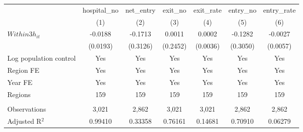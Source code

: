 \begingroup
\centering
\begin{tabular}{lcccccc}
   \toprule
                          & hospital\_no  & net\_entry  & exit\_no  & exit\_rate  & entry\_no  & entry\_rate \\    
                          & (1)           & (2)         & (3)       & (4)         & (5)        & (6)\\  
   \midrule 
   $Within3h_{it}$        & -0.0188       & -0.1713     & 0.0011    & 0.0002      & -0.1282    & -0.0027\\   
                          & (0.0193)      & (0.3126)    & (0.2452)  & (0.0036)    & (0.3050)   & (0.0057)\\   
   Log population control & Yes           & Yes         & Yes       & Yes         & Yes        & Yes\\  
   Region FE              & Yes           & Yes         & Yes       & Yes         & Yes        & Yes\\  
   Year FE                & Yes           & Yes         & Yes       & Yes         & Yes        & Yes\\  
   Regions                & 159           & 159         & 159       & 159         & 159        & 159\\  
    \\
   Observations           & 3,021         & 2,862       & 3,021     & 3,021       & 2,862      & 2,862\\  
   Adjusted R$^2$         & 0.99410       & 0.33358     & 0.76161   & 0.14681     & 0.70910    & 0.06279\\  
   \bottomrule
\end{tabular}
\par\endgroup
